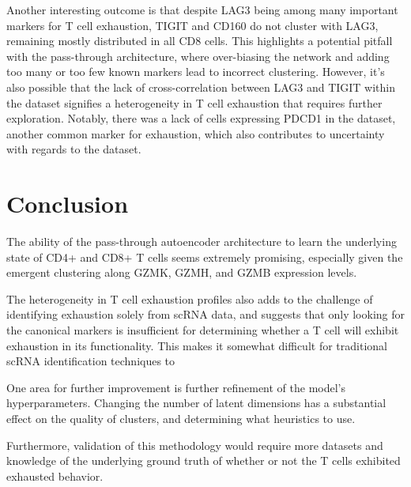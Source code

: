 \documentclass[journal]{IEEEtran}
\begin{document}
Another interesting outcome is that despite LAG3 being among many important markers for T cell exhaustion, TIGIT and CD160 do not cluster with LAG3, remaining mostly distributed in all CD8 cells. This highlights a potential pitfall with the pass-through architecture, where over-biasing the network and adding too many or too few known markers lead to incorrect clustering. However, it's also possible that the lack of cross-correlation between LAG3 and TIGIT within the dataset signifies a heterogeneity in T cell exhaustion that requires further exploration. Notably, there was a lack of cells expressing PDCD1 in the dataset, another common marker for exhaustion, which also contributes to uncertainty with regards to the dataset.


\section{Conclusion}
The ability of the pass-through autoencoder architecture to learn the underlying state of CD4+ and CD8+ T cells seems extremely promising, especially given the emergent clustering along GZMK, GZMH, and GZMB expression levels.

The heterogeneity in T cell exhaustion profiles also adds to the challenge of identifying exhaustion solely from scRNA data, and suggests that only looking for the canonical markers is insufficient for determining whether a T cell will exhibit exhaustion in its functionality. This makes it somewhat difficult for traditional scRNA identification techniques to



One area for further improvement is further refinement of the model's hyperparameters. Changing the number of latent dimensions has a substantial effect on the quality of clusters, and determining what heuristics to use.

Furthermore, validation of this methodology would require more datasets and knowledge of the underlying ground truth of whether or not the T cells exhibited exhausted behavior.


\ifCLASSOPTIONcaptionsoff
  \newpage
\fi


\end{document}
